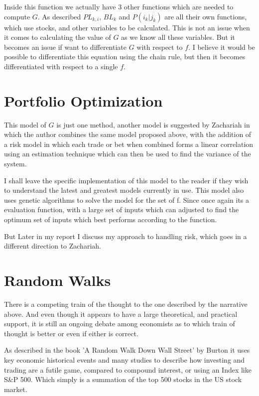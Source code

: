 \documentclass[12pt]{article}
\begin{document}
    Inside this function we actually have 3 other functions which are needed to compute \(G\).
    As described \(PL_{k,i}\), \(BL_k\) and \(P(i_k | j_k)\) are all their own functions, which
    use stocks, and other variables to be calculated. This is not an issue when it comes to
    calculating the value of \(G\) as we know all these variables. But it becomes an issue if
    want to differentiate \(G\) with respect to \(f\). I believe it would be possible to
    differentiate this equation using the chain rule, but then it becomes differentiated with
    respect to a single \(f\).

\section{Portfolio Optimization}

    This model of \(G\) is just one method, another model is suggested by Zachariah
    \cite{Zachariah} in which the author combines the same model proposed above, with the 
    addition of a risk model in which each trade or bet when combined forms a linear correlation 
    using an estimation technique which can then be used to find the variance of the system.

    I shall leave the specific implementation of this model to the reader if they wish to 
    understand the latest and greatest models currently in use. This model also uses genetic 
    algorithms to solve the model for the set of f. Since once again its a evaluation function, 
    with a large set of inputs which can adjusted to find the optimum set of inputs which best 
    performs according to the function.

    But Later in my report I discuss my approach to handling risk, which goes in a different
    direction to Zachariah.


\section{Random Walks}

    There is a competing train of the thought to the one described by the narrative above. And 
    even though it appears to have a large theoretical, and practical support, it is still an 
    ongoing debate among economists as to which train of thought is better or even if either is 
    correct.

    As described in the book 'A Random Walk Down Wall Street' by Burton \cite{Burton} it uses
    key economic historical events and many studies to describe how investing and trading are
    a futile game, compared to compound interest, or using an Index like S\&P 500. Which
    simply is a summation of the top 500 stocks in the US stock market.
\end{document}
